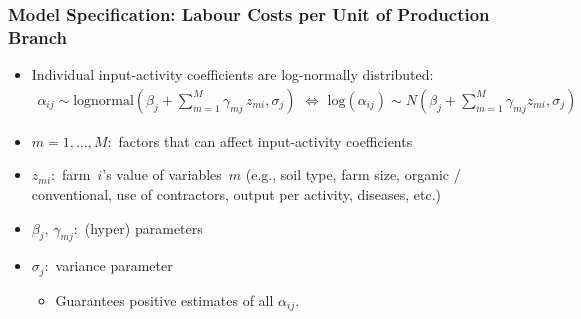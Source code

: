 \documentclass[t,24pt,aspectratio=169]{beamer}
\begin{document}
\begin{frame}[hvid]
\frametitle{\vspace{-3ex}Model Specification: Labour Costs per Unit of Production Branch}
\begin{itemize}
    \item Individual input-activity coefficients are log-normally distributed:
    \begin{align*}
        \alpha_{ij} \sim \text{lognormal}\left(\beta_j+\sum_{m=1}^{M} \gamma_{mj} \, z_{mi}, \sigma_{j} \right) \,\,
        \Longleftrightarrow \,\, \text{log}( \alpha_{ij} ) \sim N \left( \beta_j +     \sum_{m=1}^M \gamma_{mj} z_{mi}, \sigma_{j} \right)
    \end{align*}
\end{itemize}
\begin{itemize}
    \item $m = 1, \ldots, M:$ factors that can affect input-activity coefficients
    \item $z_{mi}:$ farm~$i$'s value of variables~$m$ (e.g., soil type, farm size, organic / conventional, use of contractors, output per activity, diseases, etc.)
    \item $\beta_j$, $\gamma_{mj}:$ (hyper) parameters
    \item $\sigma_j:$ variance parameter
    \vspace{2ex}
    \begin{itemize}
        \item[\fontsize{12pt}{14pt}\selectfont $\Rightarrow$] \fontsize{11pt}{14pt}\selectfont Guarantees positive estimates of all $\alpha_{ij}$.
    \end{itemize}
\end{itemize}
\end{frame}
\end{document}

